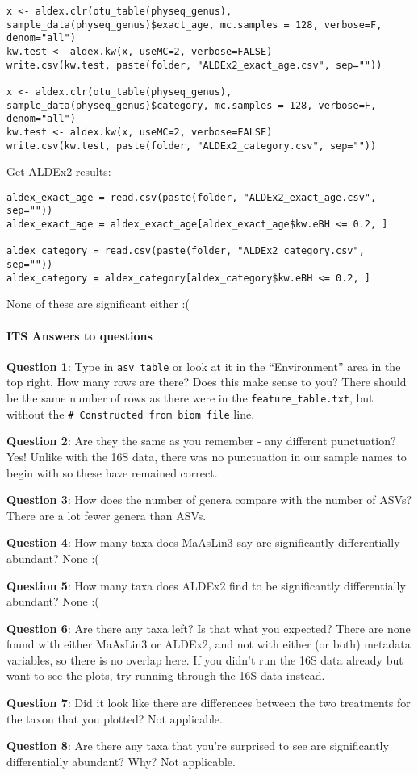 \documentclass[
]{book}
\begin{document}
\begin{verbatim}
x <- aldex.clr(otu_table(physeq_genus), sample_data(physeq_genus)$exact_age, mc.samples = 128, verbose=F, denom="all")
kw.test <- aldex.kw(x, useMC=2, verbose=FALSE)
write.csv(kw.test, paste(folder, "ALDEx2_exact_age.csv", sep=""))

x <- aldex.clr(otu_table(physeq_genus), sample_data(physeq_genus)$category, mc.samples = 128, verbose=F, denom="all")
kw.test <- aldex.kw(x, useMC=2, verbose=FALSE)
write.csv(kw.test, paste(folder, "ALDEx2_category.csv", sep=""))
\end{verbatim}

Get ALDEx2 results:

\begin{verbatim}
aldex_exact_age = read.csv(paste(folder, "ALDEx2_exact_age.csv", sep=""))
aldex_exact_age = aldex_exact_age[aldex_exact_age$kw.eBH <= 0.2, ]

aldex_category = read.csv(paste(folder, "ALDEx2_category.csv", sep=""))
aldex_category = aldex_category[aldex_category$kw.eBH <= 0.2, ]
\end{verbatim}

None of these are significant either :(

\paragraph{ITS Answers to questions}\label{its-answers-to-questions}

\textbf{Question 1}: Type in \texttt{asv\_table} or look at it in the ``Environment'' area in the top right. How many rows are there? Does this make sense to you?
There should be the same number of rows as there were in the \texttt{feature\_table.txt}, but without the \texttt{\#\ Constructed\ from\ biom\ file} line.

\textbf{Question 2}: Are they the same as you remember - any different punctuation?
Yes! Unlike with the 16S data, there was no punctuation in our sample names to begin with so these have remained correct.

\textbf{Question 3}: How does the number of genera compare with the number of ASVs?
There are a lot fewer genera than ASVs.

\textbf{Question 4}: How many taxa does MaAsLin3 say are significantly differentially abundant?
None :(

\textbf{Question 5}: How many taxa does ALDEx2 find to be significantly differentially abundant?
None :(

\textbf{Question 6}: Are there any taxa left? Is that what you expected?
There are none found with either MaAsLin3 or ALDEx2, and not with either (or both) metadata variables, so there is no overlap here. If you didn't run the 16S data already but want to see the plots, try running through the 16S data instead.

\textbf{Question 7}: Did it look like there are differences between the two treatments for the taxon that you plotted?
Not applicable.

\textbf{Question 8}: Are there any taxa that you're surprised to see are significantly differentially abundant? Why?
Not applicable.

  
\end{document}
